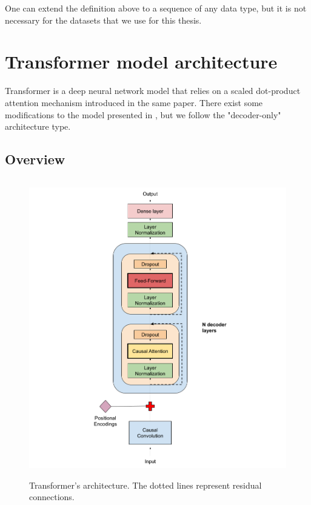 \documentclass[en]{pracamgr}
\begin{document}
One can extend the definition above to a sequence of any data type, but it is not necessary for the datasets that we use for this thesis.

%
%
%

\section{Transformer model architecture}\label{s:architecture}

Transformer \cite{tr} is a deep neural network model that relies on a scaled dot-product attention mechanism introduced in the same paper. There exist some modifications to the model presented in \cite{tr}, but we follow the "decoder-only" \cite{wikipedia} architecture type.

\subsection{Overview}

\begin{figure}[ht!]
	\centering
	\includegraphics[height=130mm]{decoder3.png}
	\caption{Transformer's architecture. The dotted lines represent residual connections. \label{our-decoder}}
\end{figure}
\end{document}
